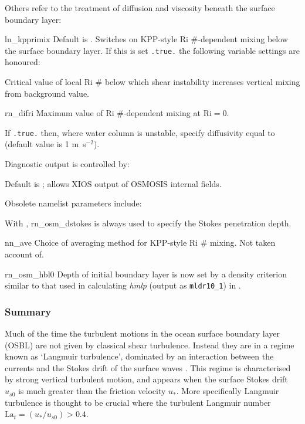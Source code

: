 \documentclass[../main/NEMO_manual]{subfiles}
\begin{document}
    Others refer to the treatment of diffusion and viscosity beneath
    the surface boundary layer:
\begin{description}
   \item \protect{} {ln\_kpprimix}  Default is . Switches on KPP-style Ri \#-dependent
     mixing below the surface boundary layer. If this is set
     \texttt{.true.}  the following variable settings are honoured:
    \item \protect{} Critical value of local Ri \# below which
      shear instability increases vertical mixing from background value.
    \item \protect{} {rn\_difri} Maximum value of Ri \#-dependent mixing at $\mathrm{Ri}=0$.
    \item \protect{} If \texttt{.true.} then, where water column is unstable, specify
       diffusivity equal to \protect{} (default value is 1 m~s$^{-2}$).
 \end{description}
 Diagnostic output is controlled by:
  \begin{description}
    \item \protect{} Default is ; allows XIOS output of OSMOSIS internal fields.
  \end{description}
Obsolete namelist parameters include:
\begin{description}
   \item \protect{} With \protect{},
      \protect{} {rn\_osm\_dstokes} is always used to specify the Stokes
      penetration depth.
   \item \protect{} {nn\_ave} Choice of averaging method for KPP-style Ri \#
      mixing. Not taken account of.
   \item \protect{} {rn\_osm\_hbl0} Depth of initial boundary layer is now set
     by a density criterion similar to that used in calculating \emph{hmlp} (output as \texttt{mldr10\_1}) in .
\end{description}

\subsubsection{Summary}
Much of the time the turbulent motions in the ocean surface boundary
layer (OSBL) are not given by
classical shear turbulence. Instead they are in a regime known as
`Langmuir turbulence',  dominated by an
interaction between the currents and the Stokes drift of the surface waves \citep[e.g.][]{mcwilliams.ea_JFM97}.
This regime is characterised by strong vertical turbulent motion, and appears when the surface Stokes drift $u_{s0}$ is much greater than the friction velocity $u_{\ast}$. More specifically Langmuir turbulence is thought to be crucial where the turbulent Langmuir number $\mathrm{La}_{t}=(u_{\ast}/u_{s0}) > 0.4$.
\end{document}
